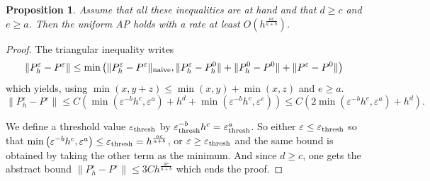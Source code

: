 \documentclass[a4paper,french,english,10pt]{article}
\newcommand\eps{\varepsilon}
\newtheorem{pro}[theorem]{Proposition}
\begin{document}
\begin{pro} \label{prop:1}
 Assume that all these inequalities are at 
hand and that $d\geq c$ and $e\geq a$.
 Then the uniform AP holds with a rate at least
$O\left(h{^\frac{ac}{a+b}  } \right)$.
\end{pro}
\begin{proof}
The triangular inequality writes
$$
\| P_h^\varepsilon - P^\varepsilon   \|
\leq
\min
\left(
\| P_h^\varepsilon - P^\varepsilon   \|_{ {\rm naive}},
\| P_h^\eps-P_h^0\|+
\| P_h^0 - P^0   \| +
\| P^\varepsilon - P^0 \|
\right)
$$
which yields, using $\min(x,y+z)\leq \min(x,y)+\min(x,z)$ and   $e\geq a$.
\begin{equation} \label{eq:toutdebut}
\| P_h^\varepsilon - P^\varepsilon   \|
\leq
C\left(
\min
\left(
 \varepsilon ^{-b}h^c,
\eps^a
\right)+h^d+
\min\left(
 \varepsilon ^{-b}h^c,
\eps^e
\right)\right)
\leq C\left(
2\min  
\left(
 \varepsilon ^{-b}h^c,
\eps^a
\right) +h^d\right).
\end{equation}

We define a  threshold value $\varepsilon_{\rm thresh} $
by  $\varepsilon_{\rm thresh}  ^{-b}h^c=
\eps_{\rm thresh}^a$. So either $\eps\leq \varepsilon_{\rm thresh} $
so that $\min
\left(
 \varepsilon ^{-b}h^c,
\eps^a
\right)\leq \varepsilon_{\rm thresh} =h^{\frac{ac}{a+b}  }$, or 
$\eps\geq \varepsilon_{\rm thresh} $ and the same bound is obtained by 
taking the other term as the minimum.
And since $d\geq c$, one gets the abstract bound
$
\| P_h^\varepsilon - P^\varepsilon   \|
\leq
3Ch^{\frac{ac}{a+b}  }
$ which ends the proof.
\end{proof}
\end{document}
